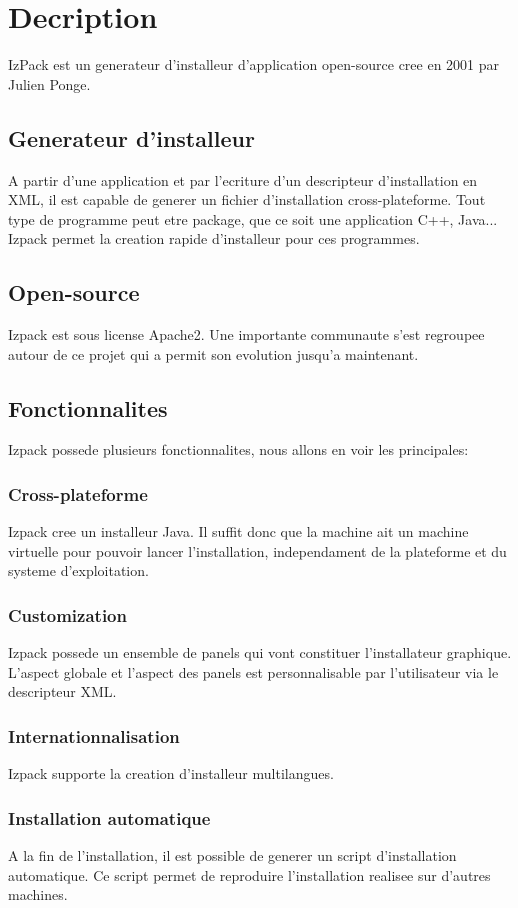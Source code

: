 \section{Decription}
IzPack est un generateur d'installeur d'application open-source cree en 2001 par Julien Ponge.
\subsection{Generateur d'installeur}
A partir d'une application et par l'ecriture d'un descripteur d'installation en XML, il est capable de generer un fichier d'installation cross-plateforme. Tout type de programme peut etre package, que ce soit une application C++, Java... Izpack permet la creation rapide d'installeur pour ces programmes.
\subsection{Open-source}
Izpack est sous license Apache2. Une importante communaute s'est regroupee autour de ce projet qui a permit son evolution jusqu'a maintenant. 

\subsection{Fonctionnalites}
Izpack possede plusieurs fonctionnalites, nous allons en voir les principales:
\subsubsection{Cross-plateforme}
Izpack cree un installeur Java. Il suffit donc que la machine ait un machine virtuelle pour pouvoir lancer l'installation, independament de la plateforme et du systeme d'exploitation.
\subsubsection{Customization}
Izpack possede un ensemble de panels qui vont constituer l'installateur graphique. L'aspect globale et l'aspect des panels est personnalisable par l'utilisateur via le descripteur XML.
\subsubsection{Internationnalisation}
Izpack supporte la creation d'installeur multilangues. 
\subsubsection{Installation automatique}
A la fin de l'installation, il est possible de generer un script d'installation automatique. Ce script permet de reproduire l'installation realisee sur d'autres machines.
